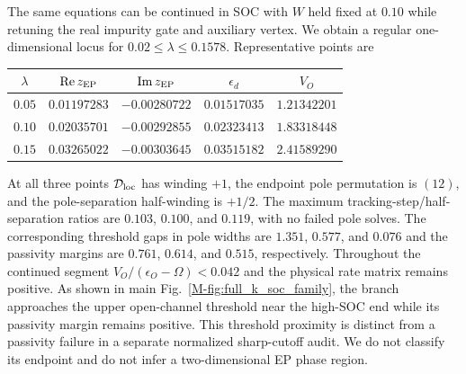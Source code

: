 \documentclass[%
  aps,physrev,onecolumn,10pt,amsmath,amssymb,superscriptaddress,longbibliography,floatfix
]{revtex4-2}
\begin{document}
The same equations can be continued in SOC with $W$ held fixed at $0.10$
while retuning the real impurity gate and auxiliary vertex.  We obtain a
regular one-dimensional locus for
$0.02\leq\lambda\leq0.1578$.  Representative points are
\begin{center}
\begin{tabular}{@{}ccccc@{}}
\toprule $\lambda$ & $\operatorname{Re}z_{\rm EP}$ & $\operatorname{Im}z_{\rm EP}$
& $\epsilon_d$ & $V_O$ \\
\midrule
$0.05$ & $0.01197283$ & $-0.00280722$ & $0.01517035$ & $1.21342201$ \\
$0.10$ & $0.02035701$ & $-0.00292855$ & $0.02323413$ & $1.83318448$ \\
$0.15$ & $0.03265022$ & $-0.00303645$ & $0.03515182$ & $2.41589290$ \\
\bottomrule
\end{tabular}
\end{center}
At all three points ${\cal D}_{\rm loc}$ has winding $+1$, the endpoint pole
permutation is $(12)$, and the pole-separation half-winding is $+1/2$.  The
maximum tracking-step/half-separation ratios are $0.103$, $0.100$, and
$0.119$, with no failed pole solves.  The corresponding threshold gaps in
pole widths are $1.351$, $0.577$, and $0.076$ and the passivity margins are
$0.761$, $0.614$, and $0.515$, respectively.  Throughout the continued segment
$V_O/(\epsilon_O-\Omega)<0.042$ and the physical rate matrix remains
positive.  As shown in main Fig.~\ref{M-fig:full_k_soc_family}, the branch
approaches the upper open-channel threshold near the high-SOC end while its
passivity margin remains positive.  This threshold proximity is distinct
from a passivity failure in a separate normalized sharp-cutoff audit.  We do
not classify its endpoint and do not infer a two-dimensional EP phase region.
\end{document}
